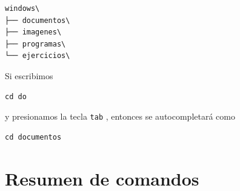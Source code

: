 \documentclass[11pt,a4paper]{article}
\begin{document}
\begin{lstlisting}
windows\
├── documentos\
├── imagenes\
├── programas\
└── ejercicios\
\end{lstlisting}

Si escribimos 

\begin{lstlisting}
cd do
\end{lstlisting}

\noindent y presionamos la tecla \texttt{tab} \keys{\tab}, entonces se autocompletará como

\begin{lstlisting}
cd documentos
\end{lstlisting}


\newpage
\appendix
\section{Resumen de comandos}
\end{document}
